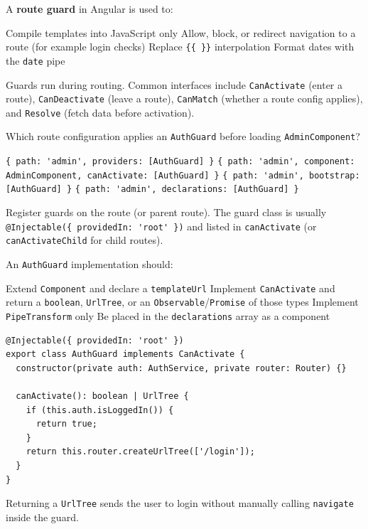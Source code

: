 \question[4]
A \textbf{route guard} in Angular is used to:
\begin{choices}
  \choice Compile templates into JavaScript only
  \CorrectChoice Allow, block, or redirect navigation to a route (for example login checks)
  \choice Replace \lstinline[style=htmlinline]|{{ }}| interpolation
  \choice Format dates with the \lstinline[style=htmlinline]|date| pipe
\end{choices}
\begin{solution}
  Guards run during routing. Common interfaces include \lstinline[style=tsinline]|CanActivate| (enter a route), \lstinline[style=tsinline]|CanDeactivate| (leave a route), \lstinline[style=tsinline]|CanMatch| (whether a route config applies), and \lstinline[style=tsinline]|Resolve| (fetch data before activation).
\end{solution}

\question[4]
Which route configuration applies an \texttt{AuthGuard} before loading \texttt{AdminComponent}?
\begin{choices}
  \choice \lstinline[style=tsinline]|{ path: 'admin', providers: [AuthGuard] }|
  \CorrectChoice \lstinline[style=tsinline]|{ path: 'admin', component: AdminComponent, canActivate: [AuthGuard] }|
  \choice \lstinline[style=tsinline]|{ path: 'admin', bootstrap: [AuthGuard] }|
  \choice \lstinline[style=tsinline]|{ path: 'admin', declarations: [AuthGuard] }|
\end{choices}
\begin{solution}
  Register guards on the route (or parent route). The guard class is usually \lstinline[style=tsinline]|@Injectable({ providedIn: 'root' })| and listed in \lstinline[style=tsinline]|canActivate| (or \lstinline[style=tsinline]|canActivateChild| for child routes).
\end{solution}

\question[4]
An \texttt{AuthGuard} implementation should:
\begin{choices}
  \choice Extend \lstinline[style=tsinline]|Component| and declare a \texttt{templateUrl}
  \CorrectChoice Implement \lstinline[style=tsinline]|CanActivate| and return a \texttt{boolean}, \lstinline[style=tsinline]|UrlTree|, or an \texttt{Observable}/\texttt{Promise} of those types
  \choice Implement \lstinline[style=tsinline]|PipeTransform| only
  \choice Be placed in the \texttt{declarations} array as a component
\end{choices}
\begin{solution}
\begin{lstlisting}[style=ts]
@Injectable({ providedIn: 'root' })
export class AuthGuard implements CanActivate {
  constructor(private auth: AuthService, private router: Router) {}

  canActivate(): boolean | UrlTree {
    if (this.auth.isLoggedIn()) {
      return true;
    }
    return this.router.createUrlTree(['/login']);
  }
}
\end{lstlisting}
  Returning a \lstinline[style=tsinline]|UrlTree| sends the user to login without manually calling \lstinline[style=tsinline]|navigate| inside the guard.
\end{solution}

